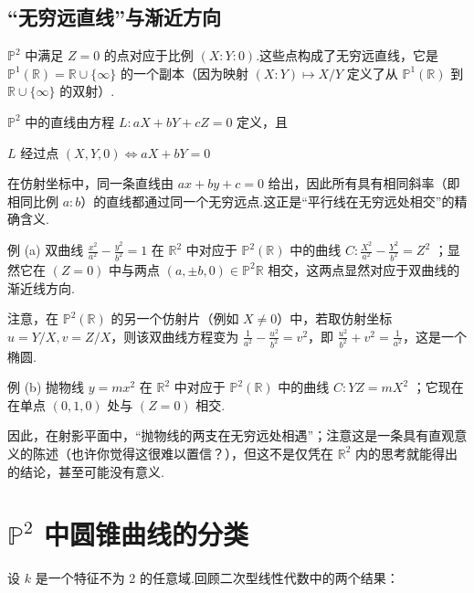 \subsection{“无穷远直线”与渐近方向}

\(\mathbb{P}^2\) 中满足 \(Z=0\) 的点对应于比例 \((X:Y:0)\).这些点构成了无穷远直线，它是 \(\mathbb{P}^1(\mathbb{R}) = \mathbb{R} \cup \{\infty\}\) 的一个副本（因为映射 \((X:Y) \mapsto X/Y\) 定义了从 \(\mathbb{P}^1(\mathbb{R})\) 到 \(\mathbb{R} \cup \{\infty\}\) 的双射）.

\(\mathbb{P}^2\) 中的直线由方程 \(L: aX + bY + cZ = 0\) 定义，且

\(
L \text{ 经过点 } (X,Y,0) \iff aX + bY = 0
\)

在仿射坐标中，同一条直线由 \(ax + by + c = 0\) 给出，因此所有具有相同斜率（即相同比例 \(a:b\)）的直线都通过同一个无穷远点.这正是“平行线在无穷远处相交”的精确含义.

例 (a) 双曲线 \(\frac{x^2}{a^2} - \frac{y^2}{b^2} = 1\) 在 \(\mathbb{R}^2\) 中对应于 \(\mathbb{P}^2(\mathbb{R})\) 中的曲线 \(C: \frac{X^2}{a^2} - \frac{Y^2}{b^2} = Z^2\) ；显然它在 \(\left( {Z = 0}\right)\) 中与两点 \(\left( {a, \pm  b,0}\right)  \in  {\mathbb{P}}^{2}\mathbb{R}\) 相交，这两点显然对应于双曲线的渐近线方向.

注意，在 \(\mathbb{P}^2(\mathbb{R})\) 的另一个仿射片（例如 \(X \neq 0\)）中，若取仿射坐标 \(u=Y/X, v=Z/X\)，则该双曲线方程变为 \(\frac{1}{a^2} - \frac{u^2}{b^2} = v^2\)，即 \(\frac{u^2}{b^2} + v^2 = \frac{1}{a^2}\)，这是一个椭圆.

例 (b) 抛物线 \(y = mx^2\) 在 \(\mathbb{R}^2\) 中对应于 \(\mathbb{P}^2(\mathbb{R})\) 中的曲线 \(C: YZ = mX^2\) ；它现在在单点 \((0,1,0)\) 处与 \(\left( {Z = 0}\right)\) 相交.

因此，在射影平面中，“抛物线的两支在无穷远处相遇”；注意这是一条具有直观意义的陈述（也许你觉得这很难以置信？），但这不是仅凭在 \(\mathbb{R}^2\) 内的思考就能得出的结论，甚至可能没有意义.

\section{\(\mathbb{P}^2\) 中圆锥曲线的分类}

设 \(k\) 是一个特征不为 2 的任意域.回顾二次型线性代数中的两个结果：

